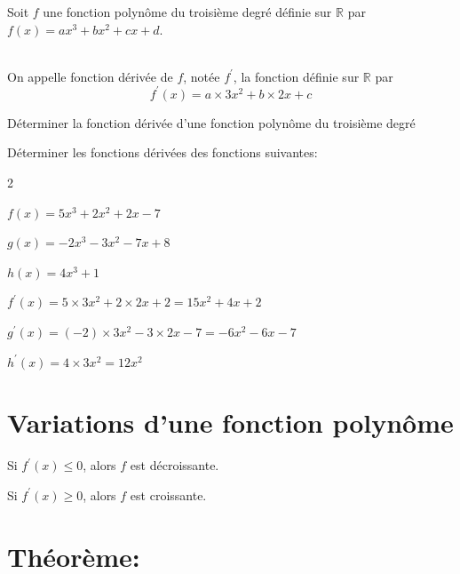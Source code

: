 \begin{definition}
	Soit $f$ une fonction polynôme du troisième degré définie sur $\mathbb{R}$ par
	$f(x)=a x^{3}+b x^{2}+c x+d$.
	
	\ \\
	
	On appelle fonction dérivée de $f$, notée $f^{\prime}$, la fonction définie sur $\mathbb{R}$ par $$f^{\prime}(x)=a \times 3 x^{2}+b \times 2 x+c$$
\end{definition}


\begin{methodeTitre}{Déterminer la fonction dérivée d'une fonction polynôme du troisième degré}
	
	Déterminer les fonctions dérivées des fonctions suivantes:
	\begin{enumMet}
		\begin{multicols}{2}
			\item $f(x)=5 x^{3}+2 x^{2}+2 x-7$
			\item $g(x)=-2 x^{3}-3 x^{2}-7 x+8$
			\item $h(x)=4 x^{3}+1$
		\end{multicols}
		
	\end{enumMet}
	
	\grasInMet{Solution :}
	\begin{enumMet}
			\item $f^{\prime}(x)=5 \times 3 x^{2}+2 \times 2 x+2=15 x^{2}+4 x+2$
			\item $g^{\prime}(x)=(-2) \times 3 x^{2}-3 \times 2 x-7=-6 x^{2}-6 x-7$
			\item $h^{\prime}(x)=4 \times 3 x^{2}=12 x^{2}$	
	\end{enumMet}
\end{methodeTitre}

\section{Variations d'une fonction polynôme}

\begin{theoreme}
	\begin{itemDef}
		\item Si $f^{\prime}(x) \leq 0$, alors $f$ est décroissante.
		\item Si $f^{\prime}(x) \geq 0$, alors $f$ est croissante.
	\end{itemDef}
\end{theoreme}
\section*{Théorème:}

